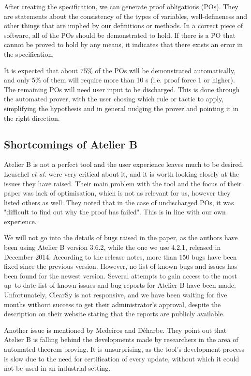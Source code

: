 \documentclass[11pt,journal]{IEEEtran}
\begin{document}
	After creating the specification, we can generate proof obligations (POs). They are statements about the consistency of the types of variables, well-defineness and other things that are implied by our definitions or methods. In a correct piece of software, all of the POs should be demonstrated to hold. If there is a PO that cannot be proved to hold by any means, it indicates that there exists an error in the specification.
	
	It is expected that about 75\% of the POs will be demonstrated automatically, and only 5\% of them will require more than 10 s (i.e. proof force 1 or higher)\cite{Prover guide}. The remaining POs will need user input to be discharged. This is done through the automated prover, with the user chosing which rule or tactic to apply, simplifying the hypothesis and in general nudging the prover and pointing it in the right direction.

	\subsection{Shortcomings of Atelier B}
	
	Atelier B is not a perfect tool and the user experience leaves much to be desired. Leuschel \emph{et al.}\cite{San Juan metro} were very critical about it, and it is worth looking closely at the issues they have raised. Their main problem with the tool and the focus of their paper was lack of optimisation, which is not as relevant for us, however they listed others as well. They noted that in the case of undischarged POs, it was "difficult to find out why the proof has failed". This is in line with our own experience.
	
	We will not go into the details of bugs raised in the paper, as the authors have been using Atelier B version 3.6.2, while the one we use 4.2.1, released in December 2014. According to the release notes, more than 150 bugs have been fixed since the previous version. However, no list of known bugs and issues has been found for the newest version\cite{release notes}. Several attempts to gain access to the most up--to-date list of known issues and bug reports for Atelier B have been made. Unfortunately, ClearSy is not responsive, and we have been waiting for five months without success to get their administrator's approval, despite the description on their website stating that the reports are publicly available.
	
	Another issue is mentioned by Medeiros and D\'{e}harbe\cite{BEval}. They point out that Atelier B is falling behind the developments made by researchers in the area of automated theorem proving. It is unsurprising, as the tool's development process is slow due to the need for certification of every update, without which it could not be used in an industrial setting.
	
\end{document}

